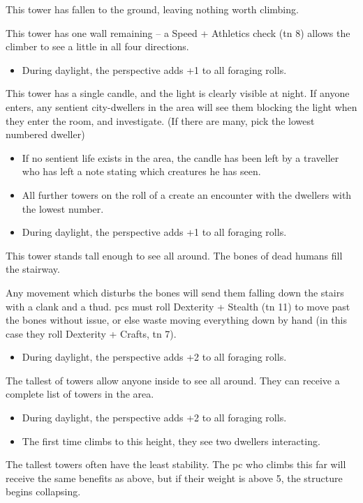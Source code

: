\begin{multicols}{2}
\begin{dlist}
  \item
  This tower has fallen to the ground, leaving nothing worth climbing.
  \item
  This tower has one wall remaining -- a Speed + Athletics check (\gls{tn} 8) allows the climber to see a little in all four directions.
  \begin{itemize}
    \item
    During daylight, the perspective adds +1 to all foraging rolls.
  \end{itemize}
  \item
  This tower has a single candle, and the light is clearly visible at night.
  If anyone enters, any sentient city-dwellers in the area will see them blocking the light when they enter the room, and investigate.
  (If there are many, pick the lowest numbered dweller)
  \begin{itemize}
    \item
    If no sentient life exists in the area, the candle has been left by a traveller who has left a note stating which creatures he has seen.
    \item
    All further towers on the roll of a  create an encounter with the dwellers with the lowest number.
    \item
    During daylight, the perspective adds +1 to all foraging rolls.
  \end{itemize}
  \item
  This tower stands tall enough to see all around.
  The bones of dead humans fill the stairway.

  Any movement which disturbs the bones will send them falling down the stairs with a clank and a thud.
  \Glspl{pc} must roll Dexterity + Stealth (\gls{tn} 11) to move past the bones without issue, or else waste  moving everything down by hand (in this case they roll Dexterity + Crafts, \gls{tn} 7).
  \begin{itemize}
    \item
    During daylight, the perspective adds +2 to all foraging rolls.
  \end{itemize}
  \item
  The tallest of towers allow anyone inside to see all around.
  They can receive a complete list of towers in the area.
  \begin{itemize}
    \item
    During daylight, the perspective adds +2 to all foraging rolls.
    \item
    The first time  climbs to this height, they see two dwellers interacting.
  \end{itemize}
  \item
  The tallest towers often have the least stability.
  The \gls{pc} who climbs this far will receive the same benefits as above, but if their \gls{weight} is above 5, the structure begins collapsing.


\end{dlist}
\end{multicols}
